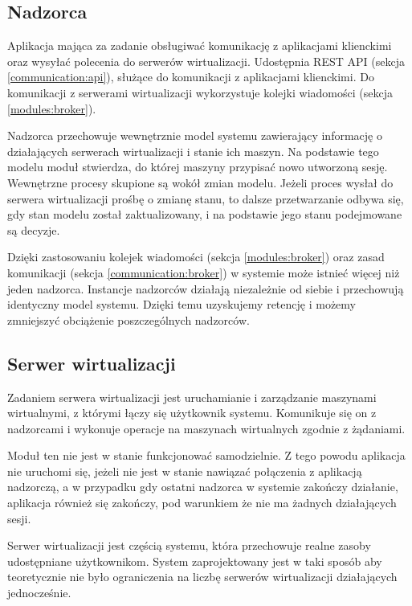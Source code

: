 \documentclass[../opis-rozwiazania.tex]{subfiles}
\begin{document}
\subsection{Nadzorca}
\label{modules:overseer}

Aplikacja mająca za zadanie obsługiwać komunikację z aplikacjami klienckimi oraz wysyłać polecenia do serwerów wirtualizacji. Udostępnia REST API (sekcja \ref{communication:api}), służące do komunikacji z aplikacjami klienckimi. Do komunikacji z serwerami wirtualizacji wykorzystuje kolejki wiadomości (sekcja \ref{modules:broker}).

Nadzorca przechowuje wewnętrznie model systemu zawierający informację o działających serwerach wirtualizacji i stanie ich maszyn. Na podstawie tego modelu moduł stwierdza, do której maszyny przypisać nowo utworzoną sesję. Wewnętrzne procesy skupione są wokół zmian modelu. Jeżeli proces wysłał do serwera wirtualizacji prośbę o zmianę stanu, to dalsze przetwarzanie odbywa się, gdy stan modelu został zaktualizowany, i na podstawie jego stanu podejmowane są decyzje.

Dzięki zastosowaniu kolejek wiadomości (sekcja \ref{modules:broker}) oraz zasad komunikacji (sekcja \ref{communication:broker}) w systemie może istnieć więcej niż jeden nadzorca. Instancje nadzorców działają niezależnie od siebie i przechowują identyczny model systemu. Dzięki temu uzyskujemy retencję i możemy zmniejszyć obciążenie poszczególnych nadzorców.

\subsection{Serwer wirtualizacji}
\label{modules:virtsrv}

Zadaniem serwera wirtualizacji jest uruchamianie i zarządzanie maszynami wirtualnymi, z którymi łączy się użytkownik systemu. Komunikuje się on z nadzorcami i wykonuje operacje na maszynach wirtualnych zgodnie z żądaniami.

Moduł ten nie jest w stanie funkcjonować samodzielnie. Z tego powodu aplikacja nie uruchomi się, jeżeli nie jest w stanie nawiązać połączenia z aplikacją nadzorczą, a w przypadku gdy ostatni nadzorca w systemie zakończy działanie, aplikacja również się zakończy, pod warunkiem że nie ma żadnych działających sesji.

Serwer wirtualizacji jest częścią systemu, która przechowuje realne zasoby udostępniane użytkownikom.
System zaprojektowany jest w taki sposób aby teoretycznie nie było ograniczenia na liczbę serwerów wirtualizacji działających jednocześnie.
\end{document}
